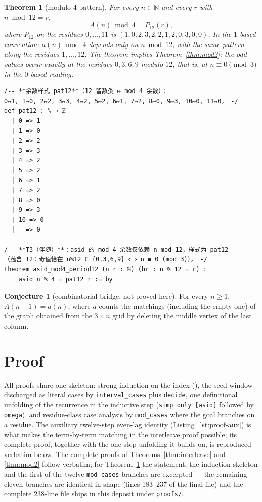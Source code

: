 \documentclass[11pt]{article}
\newtheorem{theorem}{Theorem}
\theoremstyle{definition}
\newtheorem{conjecture}{Conjecture}
\begin{document}
\begin{theorem}[modulo $4$ pattern]\label{thm:mod4}
For every $n\in\mathbb{N}$ and every $r$ with $n\bmod 12=r$,
\[
  A(n)\bmod 4=P_{12}(r),
\]
where $P_{12}$ on the residues $0,\dots,11$ is
$(1,0,2,3,2,2,1,2,0,3,0,0)$. In the $1$-based convention: $a(n)\bmod 4$
depends only on $n\bmod 12$, with the same pattern along the residues
$1,\dots,12$. The theorem implies Theorem~\ref{thm:mod2}: the odd values
occur exactly at the residues $0,3,6,9$ modulo $12$, that is, at
$n\equiv 0\pmod 3$ in the $0$-based reading.
\end{theorem}

\begin{lstlisting}[caption={Pattern \texttt{pat12} and the statement of Theorem~\ref{thm:mod4}, verbatim from the frozen statement file (lines 89--108, sha256 \texttt{5fe889d5}).},label={lst:stmt-t3}]
/-- **余数样式 pat12**（12 留数类 ↦ mod 4 余数）：
0↦1, 1↦0, 2↦2, 3↦3, 4↦2, 5↦2, 6↦1, 7↦2, 8↦0, 9↦3, 10↦0, 11↦0。 -/
def pat12 : ℕ → ℤ
  | 0 => 1
  | 1 => 0
  | 2 => 2
  | 3 => 3
  | 4 => 2
  | 5 => 2
  | 6 => 1
  | 7 => 2
  | 8 => 0
  | 9 => 3
  | 10 => 0
  | _ => 0

/-- **T3（伴随）**：asid 的 mod 4 余数仅依赖 n mod 12，样式为 pat12
（蕴含 T2：奇值恰在 n%12 ∈ {0,3,6,9} ⟺ n ≡ 0 (mod 3)）。 -/
theorem asid_mod4_period12 (n r : ℕ) (hr : n % 12 = r) :
    asid n % 4 = pat12 r := by
\end{lstlisting}

\begin{conjecture}[combinatorial bridge, not proved here]\label{conj:bridge}
For every $n\ge 1$, $A(n-1)=a(n)$, where $a$ counts the matchings (including
the empty one) of the graph obtained from the $3\times n$ grid by deleting
the middle vertex of the last column.
\end{conjecture}

\section{Proof}\label{sec:proof}

All proofs share one skeleton: strong induction on the index
(), the seed window discharged as literal cases
by \texttt{interval\_cases} plus \texttt{decide}, one definitional unfolding
of the recurrence in the inductive step (\texttt{simp only [asid]} followed
by \texttt{omega}), and residue-class case analysis by \texttt{mod\_cases}
where the goal branches on a residue. The auxiliary twelve-step even-lag
identity  (Listing~\ref{lst:proof-aux}) is what makes
the term-by-term matching in the interleave proof possible; its complete
proof, together with the one-step unfolding  it builds on, is
reproduced verbatim below. The complete proofs of
Theorems~\ref{thm:interleave} and \ref{thm:mod2} follow verbatim; for
Theorem~\ref{thm:mod4} the statement, the induction skeleton and the first of
the twelve \texttt{mod\_cases} branches are excerpted --- the remaining eleven
branches are identical in shape (lines 183--237 of the final file) and the
complete $238$-line file ships in this deposit under \texttt{proofs/}.
\end{document}
